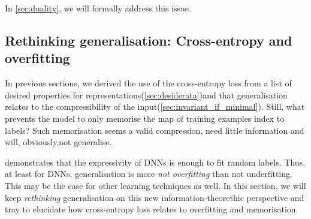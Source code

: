 In \cref{sec:duality}, we will formally address this issue.

\subsection[Rethinking generalisation: \\Cross-entropy and overfitting]{Rethinking generalisation: Cross-entropy and overfitting}
 In previous sections, we derived the use of the cross-entropy loss from a list of desired properties for representations(\cref{sec:desiderata})and that generalisation relates to the compressibility of the input(\cref{sec:invariant_if_minimal}). Still, what prevents the model to only memorise the map of training examples index to labels? Such memorisation seems a valid compression, need little information and will, obviously,not generalise.

 \cite{zhang:2016} demonstrates that the expressivity of \acp{DNN} is enough to fit random labels. Thus, at least for \acp{DNN}, generalisation is more \emph{not overfitting} than {not underfitting}.  This may be the case for other learning techniques as well. In this section, we will keep \emph{rethinking} generalisation on this new information-theorethic perspective and tray to elucidate how cross-entropy loss relates to overfitting and memorisation.

